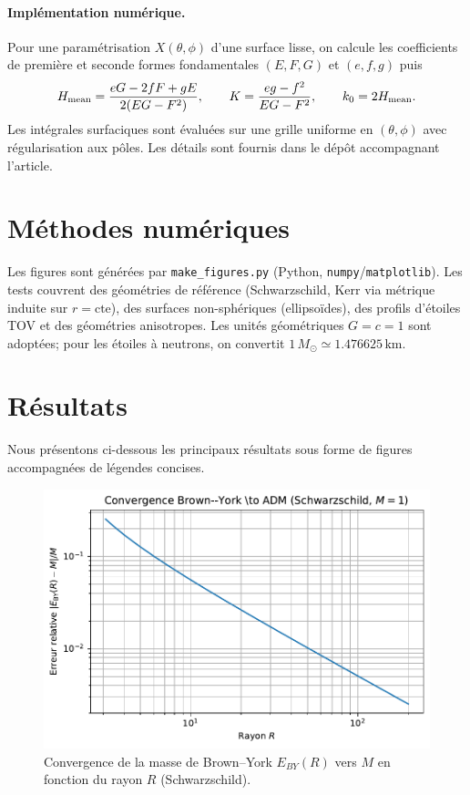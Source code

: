 \documentclass[11pt,a4paper]{article}
\theoremstyle{remark}
\begin{document}
\paragraph{Implémentation numérique.}
Pour une paramétrisation $X(\theta,\phi)$ d'une surface lisse,
on calcule les coefficients de première et seconde formes fondamentales
$(E,F,G)$ et $(e,f,g)$ puis
\begin{equation}
  H_{\rm mean}=\frac{eG-2fF+gE}{2(EG-F^2)}, \qquad
  K=\frac{eg-f^2}{EG-F^2}, \qquad
  k_0 = 2H_{\rm mean}.
\end{equation}
Les intégrales surfaciques sont évaluées sur une grille uniforme en $(\theta,\phi)$
avec régularisation aux pôles. Les détails sont fournis dans le dépôt accompagnant l'article.

\section{Méthodes numériques}
Les figures sont générées par \texttt{make\_figures.py} (Python, \texttt{numpy}/\texttt{matplotlib}).
Les tests couvrent des géométries de référence (Schwarzschild, Kerr via métrique induite sur $r=\mathrm{cte}$),
des surfaces non-sphériques (ellipsoïdes), des profils d'étoiles TOV et des géométries anisotropes.
Les unités géométriques $G=c=1$ sont adoptées; pour les étoiles à neutrons, on convertit
$1\,M_\odot\simeq 1.476625\,\mathrm{km}$.

\section{Résultats}
Nous présentons ci-dessous les principaux résultats sous forme de figures accompagnées de légendes concises.
\begin{figure}[htbp]
  \centering
  \includegraphics[width=\linewidth]{fig_error_vs_radius_improved.pdf}
  \caption{Convergence de la masse de Brown–York $E_{BY}(R)$ vers $M$ en fonction du rayon $R$ (Schwarzschild).}
  \label{fig:fig_error_vs_radius_improved}
\end{figure}
\end{document}
